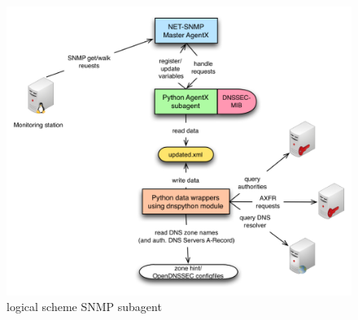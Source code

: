 \begin{figure}[H]
\centering
\includegraphics[scale=0.7]{Images/topology3.pdf}
\caption{logical scheme SNMP subagent}
\label{figure:subagent}
\end{figure}
 
